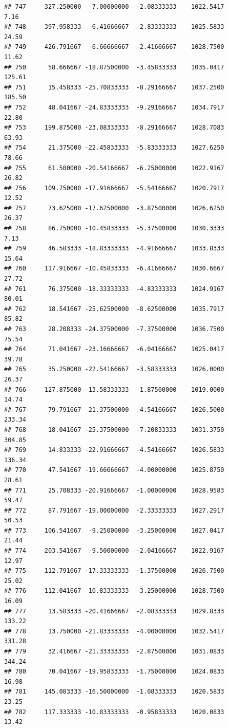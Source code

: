 \documentclass[
]{article}
\begin{document}
\begin{verbatim}
## 747     327.250000  -7.00000000  -2.08333333    1022.5417        7.16
## 748     397.958333  -6.41666667  -2.83333333    1025.5833       24.59
## 749     426.791667  -6.66666667  -2.41666667    1028.7500       11.62
## 750      58.666667 -18.87500000  -3.45833333    1035.0417      125.61
## 751      15.458333 -25.70833333  -8.29166667    1037.2500      185.50
## 752      48.041667 -24.83333333  -9.29166667    1034.7917       22.80
## 753     199.875000 -23.08333333  -8.29166667    1028.7083       63.93
## 754      21.375000 -22.45833333  -5.83333333    1027.6250       78.66
## 755      61.500000 -20.54166667  -6.25000000    1022.9167       26.82
## 756     109.750000 -17.91666667  -5.54166667    1020.7917       12.52
## 757      73.625000 -17.62500000  -3.87500000    1026.6250       26.37
## 758      86.750000 -10.45833333  -5.37500000    1030.3333        7.13
## 759      46.583333 -18.83333333  -4.91666667    1033.8333       15.64
## 760     117.916667 -10.45833333  -6.41666667    1030.6667       27.72
## 761      76.375000 -18.33333333  -4.83333333    1024.9167       80.01
## 762      18.541667 -25.62500000  -8.62500000    1035.7917       85.82
## 763      28.208333 -24.37500000  -7.37500000    1036.7500       75.54
## 764      71.041667 -23.16666667  -6.04166667    1025.0417       39.78
## 765      35.250000 -22.54166667  -3.58333333    1026.0000       26.37
## 766     127.875000 -13.58333333  -1.87500000    1019.0000       14.74
## 767      79.791667 -21.37500000  -4.54166667    1026.5000      233.34
## 768      18.041667 -25.37500000  -7.20833333    1031.3750      304.85
## 769      14.833333 -22.91666667  -4.54166667    1026.5833      136.34
## 770      47.541667 -19.66666667  -4.00000000    1025.8750       28.61
## 771      25.708333 -20.91666667  -1.00000000    1028.9583       59.47
## 772      87.791667 -19.00000000  -2.33333333    1027.2917       50.53
## 773     106.541667  -9.25000000  -3.25000000    1027.0417       21.44
## 774     203.541667  -9.50000000  -2.04166667    1022.9167       12.97
## 775     112.791667 -17.33333333  -1.37500000    1026.7500       25.02
## 776     112.041667 -10.83333333  -3.25000000    1028.7500       16.09
## 777      13.583333 -20.41666667  -2.08333333    1029.8333      133.22
## 778      13.750000 -21.83333333  -4.00000000    1032.5417      331.28
## 779      32.416667 -21.33333333  -2.87500000    1031.0833      344.24
## 780      70.041667 -19.95833333  -1.75000000    1024.0833       16.98
## 781     145.083333 -16.50000000  -1.08333333    1020.5833       23.25
## 782     117.333333 -10.83333333  -0.95833333    1020.0833       13.42

\end{verbatim}
\end{document}
